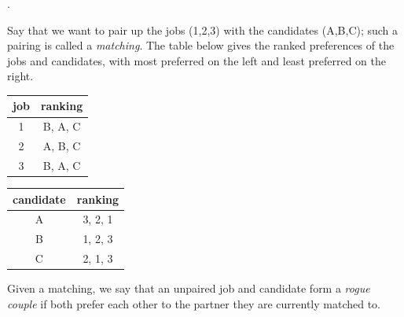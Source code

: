 \documentclass[11pt, preview]{standalone} %
\begin{document}
.

Say that we want to pair up the jobs (1,2,3) with the candidates (A,B,C); such a pairing is called a \emph{matching}. The table below gives the ranked preferences of the jobs and candidates, with most preferred on the left and least preferred on the right.

\begin{center}
\begin{tabular}{|c|c|}
\hline
job & ranking \\
\hline
1 & B, A, C \\
\hline
2 & A, B, C \\
\hline
3 & B, A, C \\
\hline
\end{tabular}
\qquad
\begin{tabular}{|c|c|}
\hline
candidate & ranking \\
\hline
A & 3, 2, 1\\
\hline
B & 1, 2, 3 \\
\hline
C & 2, 1, 3\\
\hline
\end{tabular}
\end{center}
Given a matching, we say that an unpaired job and candidate form a \emph{rogue couple} if both prefer each other to the partner they are currently matched to. 
\end{document}
